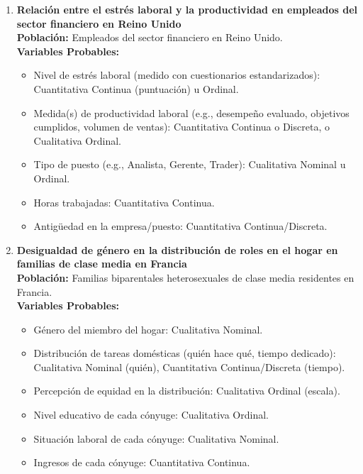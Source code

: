 \documentclass[12pt, letterpaper]{article}
\begin{document}
\begin{enumerate}
\item \textbf{Relación entre el estrés laboral y la productividad en empleados del sector financiero en Reino Unido} \\
\textbf{Población:} Empleados del sector financiero en Reino Unido. \\
\textbf{Variables Probables:}
\begin{itemize}
  \item Nivel de estrés laboral (medido con cuestionarios estandarizados): Cuantitativa Continua (puntuación) u Ordinal.
  \item Medida(s) de productividad laboral (e.g., desempeño evaluado, objetivos cumplidos, volumen de ventas): Cuantitativa Continua o Discreta, o Cualitativa Ordinal.
  \item Tipo de puesto (e.g., Analista, Gerente, Trader): Cualitativa Nominal u Ordinal.
  \item Horas trabajadas: Cuantitativa Continua.
  \item Antigüedad en la empresa/puesto: Cuantitativa Continua/Discreta.
\end{itemize}

\item \textbf{Desigualdad de género en la distribución de roles en el hogar en familias de clase media en Francia} \\
\textbf{Población:} Familias biparentales heterosexuales de clase media residentes en Francia. \\
\textbf{Variables Probables:}
\begin{itemize}
  \item Género del miembro del hogar: Cualitativa Nominal.
  \item Distribución de tareas domésticas (quién hace qué, tiempo dedicado): Cualitativa Nominal (quién), Cuantitativa Continua/Discreta (tiempo).
  \item Percepción de equidad en la distribución: Cualitativa Ordinal (escala).
  \item Nivel educativo de cada cónyuge: Cualitativa Ordinal.
  \item Situación laboral de cada cónyuge: Cualitativa Nominal.
  \item Ingresos de cada cónyuge: Cuantitativa Continua.
\end{itemize}


\end{enumerate}
\end{document}
